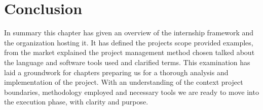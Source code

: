 \vspace{0.5cm}



\section*{Conclusion}
In summary this chapter has given an overview of the internship framework and the organization hosting it. It has defined the projects scope provided examples, from the market explained the project management method chosen talked about the language and software tools used and clarified terms. This examination has laid a groundwork for chapters preparing us for a thorough analysis and implementation of the project. With an understanding of the context project boundaries, methodology employed and necessary tools we are ready to move into the execution phase, with clarity and purpose.

